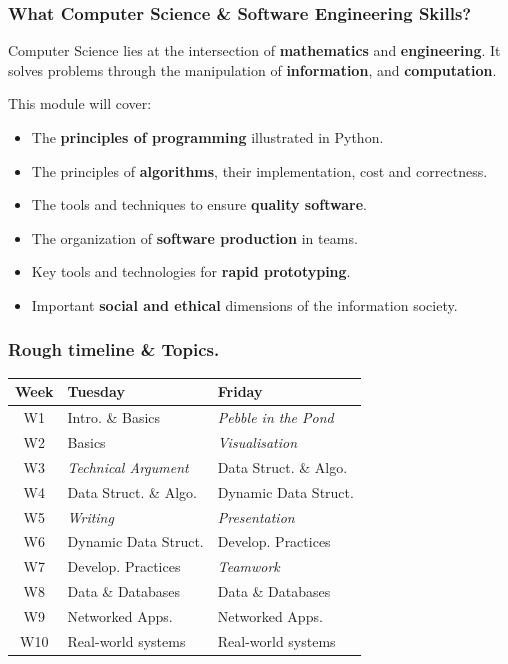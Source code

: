 \documentclass{beamer} %
\newcommand\emc[1]{\textcolor{brightblue}{\textbf{#1}}}
\begin{document}
\begin{frame}
\frametitle{What Computer Science \& Software Engineering Skills?} 

Computer Science lies at the intersection of \emc{mathematics} and \emc{engineering}. It solves problems through the manipulation of \emc{information}, and \emc{computation}.

\vspace{3mm}
This module will cover:
\begin{itemize}
	\item The \emc{principles of programming} illustrated in Python.
	\item The principles of \emc{algorithms}, their implementation, cost and correctness.
	\item The tools and techniques to ensure \emc{quality software}.
	\item The organization of \emc{software production} in teams.
	\item Key tools and technologies for \emc{rapid prototyping}.
	\item Important \emc{social and ethical} dimensions of the information society.
\end{itemize}

\end{frame}

\begin{frame}
\frametitle{Rough timeline \& Topics.} 

\begin{center}
\begin{tabular}{ c l l }
\hline 
 {\bf Week} & {\bf Tuesday} & {\bf Friday} \\ 
\hline 
W1  & Intro. \& Basics  & \emph{Pebble in the Pond}  \\  
W2  &  Basics & \emph{Visualisation} \\
W3  &  \emph{Technical Argument} & Data Struct. \& Algo.  \\
W4  &  Data Struct. \& Algo. & Dynamic Data Struct. \\
W5  & \emph{Writing} & \emph{Presentation} \\
W6  &  Dynamic Data Struct. & Develop. Practices \\
W7  &  Develop. Practices & \emph{Teamwork} \\
W8  &  Data \& Databases & Data \& Databases \\
W9  &  Networked Apps. & Networked Apps. \\
W10  & Real-world systems & Real-world systems \\
 \hline     
\end{tabular}
\end{center}

\end{frame}
\end{document}
